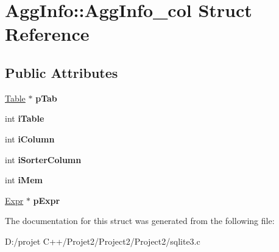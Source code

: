 \hypertarget{struct_agg_info_1_1_agg_info__col}{}\section{Agg\+Info\+:\+:Agg\+Info\+\_\+col Struct Reference}
\label{struct_agg_info_1_1_agg_info__col}
\subsection*{Public Attributes}
\begin{DoxyCompactItemize}
\item 
\mbox{\label{struct_agg_info_1_1_agg_info__col_ad2f2ae137b49e72d28a57accc9d06386}} 
\mbox{\hyperlink{struct_table}{Table}} $\ast$ {\bfseries p\+Tab}
\item 
\mbox{\label{struct_agg_info_1_1_agg_info__col_ab49aa2fbfc6278c86b64497a6807c113}} 
int {\bfseries i\+Table}
\item 
\mbox{\label{struct_agg_info_1_1_agg_info__col_a4cad2ce99ddf7425d358d49e40524f6b}} 
int {\bfseries i\+Column}
\item 
\mbox{\label{struct_agg_info_1_1_agg_info__col_ae3901ad0d5b6d519a7559358f1f7248b}} 
int {\bfseries i\+Sorter\+Column}
\item 
\mbox{\label{struct_agg_info_1_1_agg_info__col_ae22f3dfc6f9c2dc647be1b9fbd14e896}} 
int {\bfseries i\+Mem}
\item 
\mbox{\label{struct_agg_info_1_1_agg_info__col_a60f23ec0abfcc88cab7083967a3abd9e}} 
\mbox{\hyperlink{struct_expr}{Expr}} $\ast$ {\bfseries p\+Expr}
\end{DoxyCompactItemize}


The documentation for this struct was generated from the following file\+:\begin{DoxyCompactItemize}
\item 
D\+:/projet C++/\+Projet2/\+Project2/\+Project2/sqlite3.\+c\end{DoxyCompactItemize}
